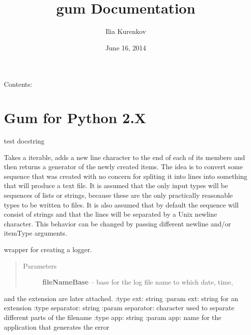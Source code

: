 \documentclass[letterpaper,10pt,english]{sphinxmanual}
\title{gum Documentation}
\date{June 16, 2014}
\author{Ilia Kurenkov}
\begin{document}
\maketitle
\tableofcontents
{}\label{index::doc}


Contents:


\chapter{Gum for Python 2.X}
\label{test:module-gum}\label{test:gum-for-python-2-x}\label{test:welcome-to-gum-s-documentation}\label{test::doc}
test docstring

\begin{fulllineitems}
\label{test:gum.add_newlines}
Takes a iterable, adds a new line character to the end of each of its
members and then returns a generator of the newly created items.
The idea is to convert some sequence that was created with no concern for
spliting it into lines into something that will produce a text file.
It is assumed that the only input types will be sequences of lists or
strings, because these are the only practically reasonable types to be
written to files.
It is also assumed that by default the sequence will consist of strings and
that the lines will be separated by a Unix newline character.
This behavior can be changed by passing different newline and/or itemType
arguments.

\end{fulllineitems}


\begin{fulllineitems}
\label{test:gum.create_debug_log}
wrapper for creating a logger.
\begin{quote}\begin{description}
\item[{Parameters}] \leavevmode
\textbf{fileNameBase} -- base for the log file name to which date, time,

\end{description}\end{quote}

and the extension are later attached.
:type ext: string
:param ext: string for an extension
:type separator: string
:param separator: character used to separate different parts of the
filename
:type app: string
:param app: name for the application that generates the error

\end{fulllineitems}
\end{document}
